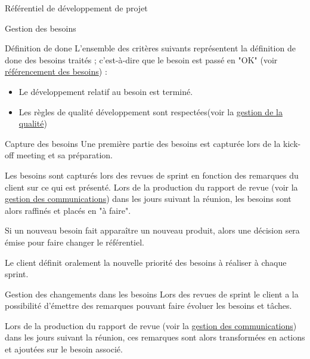 \documentclass[]{article}
\begin{document}
{\begin{section}{\label{sec:Référentiel de développement de projet}Référentiel de développement de projet}
\begin{subsection}{\label{sec:Gestion des besoins}Gestion des besoins}
        \begin{subsubsection}{\label{sec:Définition de done}Définition de done}
            L'ensemble des critères suivants représentent la définition de done des besoins traités ; c'est-à-dire que le besoin est passé en "OK" (voir \hyperref[sec:Référencement des besoins]{référencement des besoins}) : 
            \begin{itemize}
                \item Le développement relatif au besoin est terminé.
                \item Les règles de qualité développement sont respectées(voir la \hyperref[sec:Gestion de la qualité]{gestion de la qualité})
            \end{itemize}
        \end{subsubsection}

         \begin{subsubsection}{\label{sec:Capture des besoins}Capture des besoins}
             Une première partie des besoins est capturée lors de la kick-off meeting et sa préparation.

             Les besoins sont capturés lors des revues de sprint en fonction des remarques du client sur ce qui est présenté. Lors de la production du rapport de revue (voir la \hyperref[sec:Gestion de la communication]{gestion des communications}) dans les jours suivant la réunion, les besoins sont alors raffinés et placés en "à faire".

             Si un nouveau besoin fait apparaître un nouveau produit, alors une décision sera émise pour faire changer le référentiel.

             Le client définit oralement la nouvelle priorité des besoins à réaliser à chaque sprint.
         \end{subsubsection}

         \begin{subsubsection}{\label{sec:Gestion des changement dans les besoins}Gestion des changements dans les besoins}
             Lors des revues de sprint le client a la possibilité d’émettre des remarques pouvant faire évoluer les besoins et tâches.

             Lors de la production du rapport de revue (voir la \hyperref[sec:Gestion de la communication]{gestion des communications}) dans les jours suivant la réunion, ces remarques sont alors transformées en actions et ajoutées sur le besoin associé.
         \end{subsubsection}
     \end{subsection}


\end{section}}
\end{document}
